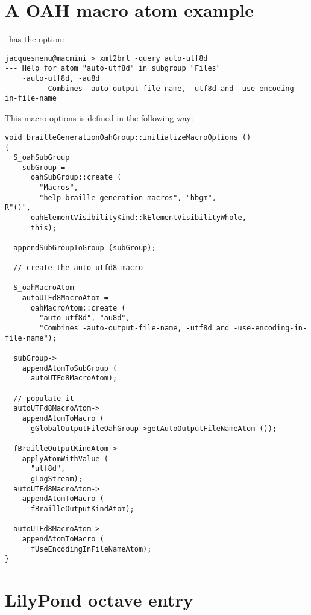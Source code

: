 \section{A OAH macro atom example}

\xmlToBrl\ has the  option:
\begin{lstlisting}[language=Terminal]
jacquesmenu@macmini > xml2brl -query auto-utf8d
--- Help for atom "auto-utf8d" in subgroup "Files"
    -auto-utf8d, -au8d
          Combines -auto-output-file-name, -utf8d and -use-encoding-in-file-name
\end{lstlisting}

This macro options is defined in  the following way:
\begin{lstlisting}[language=CPlusPlus]
void brailleGenerationOahGroup::initializeMacroOptions ()
{
  S_oahSubGroup
    subGroup =
      oahSubGroup::create (
        "Macros",
        "help-braille-generation-macros", "hbgm",
R"()",
      oahElementVisibilityKind::kElementVisibilityWhole,
      this);

  appendSubGroupToGroup (subGroup);

  // create the auto utfd8 macro

  S_oahMacroAtom
    autoUTFd8MacroAtom =
      oahMacroAtom::create (
        "auto-utf8d", "au8d",
        "Combines -auto-output-file-name, -utf8d and -use-encoding-in-file-name");

  subGroup->
    appendAtomToSubGroup (
      autoUTFd8MacroAtom);

  // populate it
  autoUTFd8MacroAtom->
    appendAtomToMacro (
      gGlobalOutputFileOahGroup->getAutoOutputFileNameAtom ());

  fBrailleOutputKindAtom->
    applyAtomWithValue (
      "utf8d",
      gLogStream);
  autoUTFd8MacroAtom->
    appendAtomToMacro (
      fBrailleOutputKindAtom);

  autoUTFd8MacroAtom->
    appendAtomToMacro (
      fUseEncodingInFileNameAtom);
}
\end{lstlisting}


\section{LilyPond octave entry}

